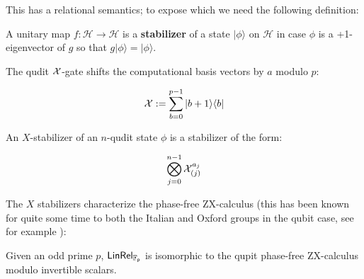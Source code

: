 This has a relational semantics; to expose which we need the following definition:


\begin{definition}
A unitary map $f:\mathcal{H}\to \mathcal{H}$ is a {\bf stabilizer} of a state $|\phi\rangle$ on $\mathcal H$ in case $\phi$ is a +1-eigenvector of $g$ so that $g| \phi\rangle = |\phi \rangle$.


The qudit ${\cal X}$-gate  shifts the computational basis vectors by $a$ modulo $p$:

$${\cal X} := \sum_{b=0}^{p-1} | b+1\rangle \langle b|$$

An $X$-stabilizer of an $n$-qudit state $\phi$ is a stabilizer of the form:

$$
\bigotimes_{j=0}^{n-1}{\cal X}_{(j)}^{a_j}
$$

\end{definition}

The $X$ stabilizers characterize the phase-free ZX-calculus (this has been known for quite some time to both the Italian and Oxford groups in the qubit case, see for example \cite[p. 8]{ih}):

\begin{lemma}
Given an odd prime $p$, $\sf LinRel_{\mathbb{F}_p}$ is isomorphic to the qupit phase-free ZX-calculus modulo invertible scalars.
\end{lemma}

